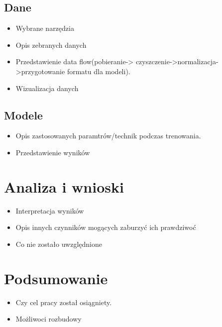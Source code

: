 \section{Dane}
\label{cha:pierwszyDokument}

\begin{itemize}
\item Wybrane narzędzia
\item Opis zebranych danych
\item Przedstawienie data flow(pobieranie-> czyszczenie->normalizacja->przygotowanie formatu dla modeli).
\item Wizualizacja danych
\end{itemize}


\section{Modele }
\label{cha:pierwszyDokument}

\begin{itemize}
\item Opis zastosowanych paramtrów/technik podczas trenowania.
\item Przedstawienie wyników 
\end{itemize}


\chapter{Analiza i wnioski }
\label{cha:pierwszyDokument}

\begin{itemize}
\item Interpretacja wyników
\item Opis innych czynników mogących zaburzyć ich prawdziwoć
\item Co nie zostało uwzględnione 
\end{itemize}


\chapter{Podsumowanie}
\label{cha:pierwszyDokument}

\begin{itemize}
\item Czy cel pracy został osiągniety.
\item Możliwoci rozbudowy
\end{itemize}
 




